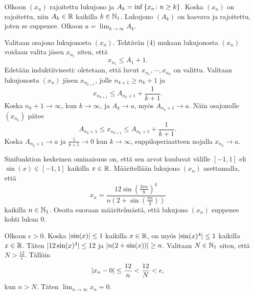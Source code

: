 \documentclass[11pt,a4paper]{amsart}
\begin{document}
\begin{solution}
Olkoon \((x_n)\) rajoitettu lukujono ja \(A_k = \inf{\left\lbrace x_n \colon
n \geq k\right\rbrace}\). Koska \((x_n)\) on rajoitettu, niin \(A_k \in \mathbb{R}\) kaikilla
\(k \in \mathbb{N}_1\). Lukujono \((A_k)\) on kasvava ja rajoitettu, joten se
suppenee. Olkoon \(a = \lim_{k \to \infty} A_k\).

Valitaan osajono lukujonosta \((x_n)\). Tehtävän (4) mukaan lukujonosta
\((x_n)\) voidaan valita jäsen \(x_{n_{1}}\) siten, että
\[
x_{n_{1}} \leq A_1 + 1.
\]
Edetään induktiivisesti: oletetaan, että luvut \(x_{n_{1}}, \cdots, x_{n_{k}}\)
on valittu. Valitaan lukujonosta \((x_n)\) jäsen \(x_{n_{k + 1}}\),
jolle \(n_{k + 1} \geq n_{k} + 1\) ja
\[
x_{n_{k + 1}} \leq A_{n_k + 1} + \frac{1}{k + 1}.
\]
Koska \(n_k + 1 \to \infty\), kun \(k \to \infty\), ja \(A_k \to a\),
myös \(A_{n_k + 1} \to a\). Näin osajonolle \((x_{n_{k}})\) pätee
\[
A_{n_k + 1} \leq x_{n_{k + 1}} \leq A_{n_k + 1} + \frac{1}{k + 1}.
\]
Koska \(A_{n_k + 1} \to a\) ja \(\frac{1}{k + 1} \to 0\) kun \(k \to \infty\),
suppiloperiaatteen nojalla \(x_{n_{k}} \to a\).
\end{solution}

\begin{exercise}
Sinifunktion keskeinen ominaisuus on, että sen arvot kuuluvat välille
\([-1, 1]\) eli \(\sin(x) \in [-1, 1]\) kaikilla \(x \in \mathbb{R}\). Määritellään
lukujono \((x_n)\) asettamalla, että
\[
x_n = \frac{12\sin(\frac{3\pi n}{8})^4}{n(2 + \sin(\frac{\pi n}{2}))}
\]
kaikilla \(n \in \mathbb{N}_1\). Osoita suoraan määritelmästä, että lukujono \((x_n)\)
suppenee kohti lukua \(0\).
\end{exercise}

\begin{solution}
Olkoon \(\epsilon > 0\). Koska \(\lvert\sin(x)\rvert \leq 1\) kaikilla \(x \in \mathbb{R}\),
on myös \(\lvert\sin(x)^4\rvert \leq 1\) kaikilla \(x \in \mathbb{R}\). Täten
\(\lvert12\sin(x)^4\rvert \leq 12\) ja \(\lvert n(2 + \sin(x))\rvert \geq n\).
Valitaan \(N \in \mathbb{N}_1\) siten, että \(N > \frac{12}{\epsilon}\). Tällöin
\[
\lvert x_n - 0\rvert \leq \frac{12}{n} < \frac{12}{N} < \epsilon,
\]
kun \(n > N\). Täten \(\lim_{n \to \infty} x_n = 0\).
\end{solution}
\end{document}

